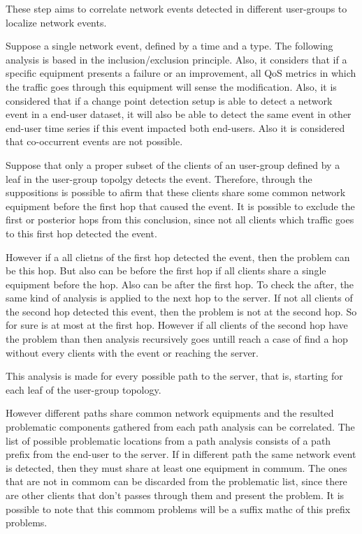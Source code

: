 These step aims to correlate network events detected in different user-groups
to localize network events.

Suppose a single network event, defined by a time and a type. The following
analysis is based in the inclusion/exclusion principle. Also, it considers that
if a specific equipment presents a failure or an improvement, all QoS metrics
in which the traffic goes through this equipment will sense the modification.
Also, it is considered that if a change point detection setup is able to
detect a network event in a end-user dataset, it will also be able to detect
the same event in other end-user time series if this event impacted both
end-users. Also it is considered that co-occurrent events are not possible.

Suppose that only a proper subset of the clients of an user-group defined by a
leaf in the user-group topolgy detects the event. Therefore, through the
suppositions is possible to afirm that these clients share some common network
equipment before the first hop that caused the event. It is possible to exclude
the first or posterior hops from this conclusion, since not all clients which
traffic goes to this first hop detected the event.

However if a all clietns of the first hop detected the event, then the  problem
can be this hop. But also can be before the first hop if all clients share a
single equipment before the hop. Also can be after the first hop. To check the
after, the same kind of analysis is applied to the next hop to the server. If
not all clients of the second hop detected this event, then the problem is not
at the second hop. So for sure is at most at the first hop. However if all
clients of the second hop have the problem than then analysis recursively goes
untill reach a case of find a hop without every clients with the event or
reaching the server.

This analysis is made for every possible path to the server, that is, starting
for each leaf of the user-group topology.

However different paths share common network equipments and the resulted
problematic components gathered from each path analysis can be correlated. The
list of possible problematic locations from a path analysis consists of a path
prefix from the end-user to the server. If in different path the same network
event is detected, then they must share at least one equipment in commum. The
ones that are not in commom can be discarded from the problematic list, since
there are other clients that don't passes through them and present the problem.
It is possible to note that this commom problems will be a suffix mathc of this
prefix problems.

